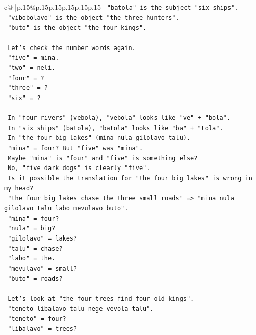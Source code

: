 \documentclass{article}
\begin{document}
{\begin{supertabular}{c@{$\;$}|p{.15\linewidth}@{}p{.15\linewidth}p{.15\linewidth}p{.15\linewidth}p{.15\linewidth}p{.15\linewidth}}
{{{\texttt{   "batola" is the subject "six ships".} \\
\texttt{   "vibobolavo" is the object "the three hunters".} \\
\texttt{   "buto" is the object "the four kings".} \\
\\ 
\texttt{   Let's check the number words again.} \\
\texttt{   "five" = mina.} \\
\texttt{   "two" = neli.} \\
\texttt{   "four" = ?} \\
\texttt{   "three" = ?} \\
\texttt{   "six" = ?} \\
\\ 
\texttt{   In "four rivers" (vebola), "vebola" looks like "ve" + "bola".} \\
\texttt{   In "six ships" (batola), "batola" looks like "ba" + "tola".} \\
\texttt{   In "the four big lakes" (mina nula gilolavo talu).} \\
\texttt{   "mina" = four? But "five" was "mina".} \\
\texttt{   Maybe "mina" is "four" and "five" is something else?} \\
\texttt{   No, "five dark dogs" is clearly "five".} \\
\texttt{   Is it possible the translation for "the four big lakes" is wrong in my head?} \\
\texttt{   "the four big lakes chase the three small roads" => "mina nula gilolavo talu labo mevulavo buto".} \\
\texttt{   "mina" = four?} \\
\texttt{   "nula" = big?} \\
\texttt{   "gilolavo" = lakes?} \\
\texttt{   "talu" = chase?} \\
\texttt{   "labo" = the.} \\
\texttt{   "mevulavo" = small?} \\
\texttt{   "buto" = roads?} \\
\\ 
\texttt{   Let's look at "the four trees find four old kings".} \\
\texttt{   "teneto libalavo talu nege vevola talu".} \\
\texttt{   "teneto" = four?} \\
\texttt{   "libalavo" = trees?} \\
}}}
\end{supertabular}}
\end{document}
